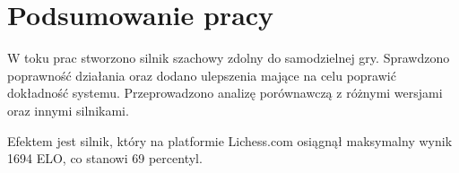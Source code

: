 \section {Podsumowanie pracy}
\label {sec: podsumowanie-pracy}

W toku prac stworzono silnik szachowy zdolny do samodzielnej gry.
Sprawdzono poprawność działania oraz dodano ulepszenia mające na celu poprawić dokładność systemu.
Przeprowadzono analizę porównawczą z różnymi wersjami oraz innymi silnikami.

Efektem jest silnik, który na platformie Lichess.com osiągnął maksymalny wynik 1694 ELO, co stanowi 69 percentyl.